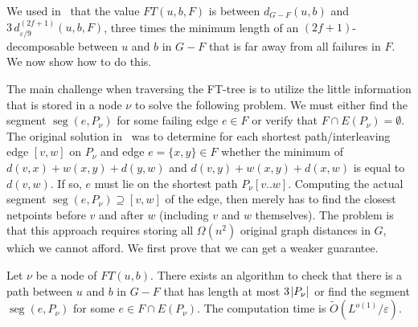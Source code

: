 \documentclass{article}\usepackage[a4paper,margin=20mm]{geometry}
\DeclareMathOperator{\seg}{seg}
\newcommand*{\Otilde}{\widetilde{O}}
\newcommand*{\length}[1]{|#1|}
\newcommand*{\nwspace}{\hspace*{.1em}}
\newcommand{\eps}{\varepsilon}
\begin{document}
We used in~ that the value $FT(u,b,F)$
is between $d_{G-F}(u,b)$ and $3 \, d^{(2f+1)}_{\eps/9}(u,b,F)$,
three times the minimum length of an $(2f{+}1)$-decomposable between $u$ and $b$ in $G{-}F$
that is far away from all failures in $F$.
We now show how to do this.

The main challenge when traversing the FT-tree is to utilize the little information that is stored
in a node $\nu$ to solve the following problem.
We must either find the segment $\seg(e,P_{\nu})$ for some failing edge $e \in F$
or verify that $F \cap E(P_{\nu}) = \emptyset$.
The original solution in~\cite{ChCoFiKa17} was to determine for each 
shortest path/interleaving edge $[v,w]$ on $P_{\nu}$ and edge $e = \{x,y\} \in F$
whether the minimum of $d(v,x) + w(x,y) + d(y,w)$ and $d(v,y) + w(x,y) + d(x,w)$
is equal to $d(v,w)$.
If so, $e$ must lie on the shortest path $P_{\nu}[v..w]$.
Computing the actual segment $\seg(e,P_{\nu}) \supseteq [v,w]$ of the edge,
then merely has to find the closest netpoints before $v$ and after $w$
(including $v$ and $w$ themselves).
The problem is that this approach requires storing all $\Omega(n^2)$ original graph distances in $G$,
which we cannot afford.
We first prove that we can get a weaker guarantee.

\begin{lemma}
\label{lem:weaker_guarantee}
  Let $\nu$ be a node of $FT(u,b)$.
  There exists an algorithm to check that
  there is a path between $u$ and $b$ in $G{-}F$
  that has length at most $3 \nwspace \length{P_{\nu}}$ 
  or find the segment $\seg(e,P_{\nu})$ 
  for some $e \in F \cap E(P_{\nu})$.
  The computation time is $\Otilde(L^{o(1)}/{\eps})$.
\end{lemma}
\end{document}
